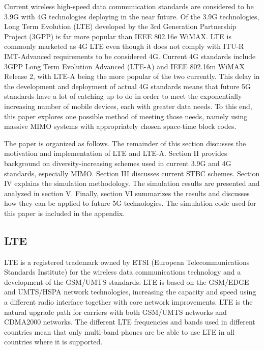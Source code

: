

Current wireless high-speed data communication standards are considered to be 3.9G with 4G technologies deploying in the near future. Of the 3.9G technologies, Long Term Evolution (LTE) developed by the 3rd Generation Partnership Project (3GPP) is far more popular than IEEE 802.16e WiMAX. LTE is commonly marketed as 4G LTE even though it does not comply with ITU-R IMT-Advanced requirements to be considered 4G. Current 4G standards include 3GPP Long Term Evolution Advanced (LTE-A) and IEEE 802.16m WiMAX Release 2, with LTE-A being the more popular of the two currently. This delay in the development and deployment of actual 4G standards means that future 5G standards have a lot of catching up to do in order to meet the exponentially increasing number of mobile devices, each with greater data needs. To this end, this paper explores one possible method of meeting those needs, namely using massive MIMO systems with appropriately chosen space-time block codes.

The paper is organized as follows. The remainder of this section discusses the motivation and implementation of LTE and LTE-A. Section II provides background on diversity-increasing schemes used in current 3.9G and 4G standards, especially MIMO. Section III discusses current STBC schemes. Section IV explains the simulation methodology. The simulation results are presented and analyzed in section V. Finally, section VI summarizes the results and discusses how they can be applied to future 5G technologies. The simulation code used for this paper is included in the appendix.

\subsection{LTE}

LTE is a registered trademark owned by ETSI (European Telecommunications Standards Institute) for the wireless data communications technology and a development of the GSM/UMTS standards. LTE is based on the GSM/EDGE and UMTS/HSPA network technologies, increasing the capacity and speed using a different radio interface together with core network improvements. LTE is the natural upgrade path for carriers with both GSM/UMTS networks and CDMA2000 networks. The different LTE frequencies and bands used in different countries mean that only multi-band phones are be able to use LTE in all countries where it is supported.

